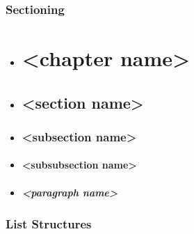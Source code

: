 \documentclass[report,english]{enacom}
\begin{document}
\subsection{Sectioning}
	\begin{itemize}
		\item \begin{lcode}
        \chapter{<chapter name>} \end{lcode}
        
        \item \begin{lcode}
        \section{<section name>} \end{lcode}
        
        \item \begin{lcode}
        \subsection{<subsection name>} \end{lcode}
	
    	\item \begin{lcode}
        \subsubsection{<subsubsection name>}
        \end{lcode}
	
    	\item \begin{lcode} 
        \paragraph{<paragraph name>} \end{lcode}
	\end{itemize}
    

\subsection{List Structures}
\end{document}
